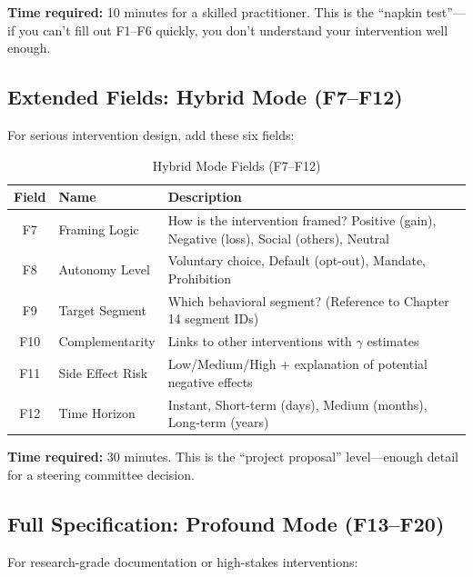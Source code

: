 \textbf{Time required:} 10 minutes for a skilled practitioner. This is the ``napkin test''---if you can't fill out F1--F6 quickly, you don't understand your intervention well enough.

\subsection{Extended Fields: Hybrid Mode (F7--F12)}

For serious intervention design, add these six fields:

\begin{table}[htbp]
\centering
\caption{Hybrid Mode Fields (F7--F12)}
\label{tab:17-hybrid-fields}
\renewcommand{\arraystretch}{1.3}
\small
\begin{tabular}{@{}clp{8cm}@{}}
\toprule
\textbf{Field} & \textbf{Name} & \textbf{Description} \\
\midrule
F7 & Framing Logic & How is the intervention framed? Positive (gain), Negative (loss), Social (others), Neutral \\
F8 & Autonomy Level & Voluntary choice, Default (opt-out), Mandate, Prohibition \\
F9 & Target Segment & Which behavioral segment? (Reference to Chapter 14 segment IDs) \\
F10 & Complementarity & Links to other interventions with $\gamma$ estimates \\
F11 & Side Effect Risk & Low/Medium/High + explanation of potential negative effects \\
F12 & Time Horizon & Instant, Short-term (days), Medium (months), Long-term (years) \\
\bottomrule
\end{tabular}
\end{table}

\textbf{Time required:} 30 minutes. This is the ``project proposal'' level---enough detail for a steering committee decision.

\subsection{Full Specification: Profound Mode (F13--F20)}

For research-grade documentation or high-stakes interventions:

